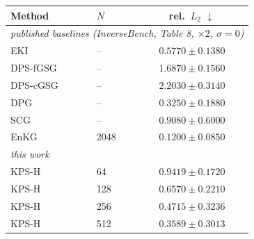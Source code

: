 \small
%
\begin{tabular}{llc}
\toprule
Method & $N$ & rel.\ $L_2$ $\downarrow$ \\
\midrule
\multicolumn{3}{l}{\emph{published baselines (InverseBench, Table 8, $\times 2$, $\sigma=0$)}} \\
EKI & -- & $0.5770 \pm 0.1380$ \\
DPS-fGSG & -- & $1.6870 \pm 0.1560$ \\
DPS-cGSG & -- & $2.2030 \pm 0.3140$ \\
DPG & -- & $0.3250 \pm 0.1880$ \\
SCG & -- & $0.9080 \pm 0.6000$ \\
EnKG & 2048 & $0.1200 \pm 0.0850$ \\
\midrule
\multicolumn{3}{l}{\emph{this work}} \\
KPS-H & 64 & $0.9419 \pm 0.1720$ \\
KPS-H & 128 & $0.6570 \pm 0.2210$ \\
KPS-H & 256 & $0.4715 \pm 0.3236$ \\
KPS-H & 512 & $0.3589 \pm 0.3013$ \\
\bottomrule
\end{tabular}
